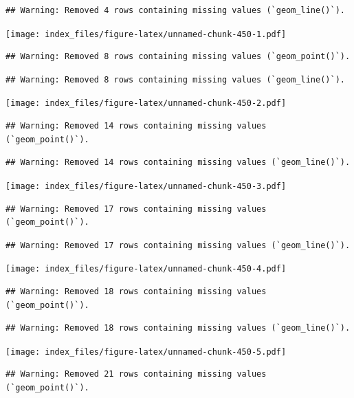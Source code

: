 \documentclass[
]{article}
\begin{document}
\begin{verbatim}
## Warning: Removed 4 rows containing missing values (`geom_line()`).
\end{verbatim}

\texttt{[image: index\_files/figure-latex/unnamed-chunk-450-1.pdf]}

\begin{verbatim}
## Warning: Removed 8 rows containing missing values (`geom_point()`).
\end{verbatim}

\begin{verbatim}
## Warning: Removed 8 rows containing missing values (`geom_line()`).
\end{verbatim}

\texttt{[image: index\_files/figure-latex/unnamed-chunk-450-2.pdf]}

\begin{verbatim}
## Warning: Removed 14 rows containing missing values (`geom_point()`).
\end{verbatim}

\begin{verbatim}
## Warning: Removed 14 rows containing missing values (`geom_line()`).
\end{verbatim}

\texttt{[image: index\_files/figure-latex/unnamed-chunk-450-3.pdf]}

\begin{verbatim}
## Warning: Removed 17 rows containing missing values (`geom_point()`).
\end{verbatim}

\begin{verbatim}
## Warning: Removed 17 rows containing missing values (`geom_line()`).
\end{verbatim}

\texttt{[image: index\_files/figure-latex/unnamed-chunk-450-4.pdf]}

\begin{verbatim}
## Warning: Removed 18 rows containing missing values (`geom_point()`).
\end{verbatim}

\begin{verbatim}
## Warning: Removed 18 rows containing missing values (`geom_line()`).
\end{verbatim}

\texttt{[image: index\_files/figure-latex/unnamed-chunk-450-5.pdf]}

\begin{verbatim}
## Warning: Removed 21 rows containing missing values (`geom_point()`).
\end{verbatim}
\end{document}
